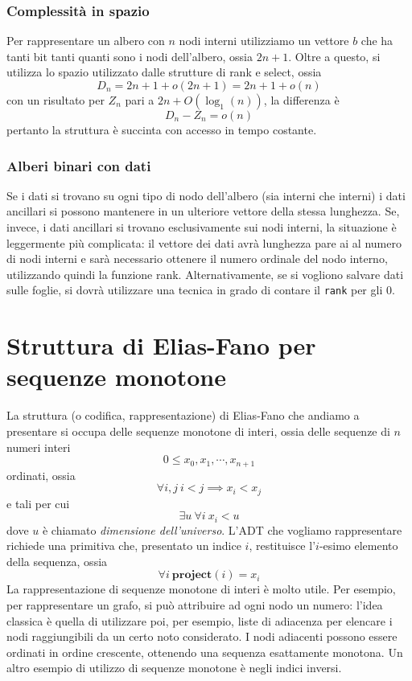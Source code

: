 \subsubsection{Complessità in spazio}
Per rappresentare un albero con $n$ nodi interni utilizziamo un vettore $b$ che ha tanti
bit tanti quanti sono i nodi dell'albero, ossia $2n +1$. Oltre a questo, si utilizza
lo spazio utilizzato dalle strutture di rank e select, ossia
$$
	D_n = 2n +1 + o(2n+1) = 2n + 1 + o(n)
$$
con un risultato per $Z_n$ pari a $2n + O(\log_1(n))$, la differenza è
$$
	D_n - Z_n = o(n)
$$
pertanto la struttura è succinta con accesso in tempo costante.

\subsubsection{Alberi binari con dati}
Se i dati si trovano su ogni tipo di nodo dell'albero (sia interni che interni) i dati
ancillari si possono mantenere in un ulteriore vettore della stessa lunghezza.
Se, invece, i dati ancillari si trovano esclusivamente sui nodi interni,
la situazione è leggermente più complicata: il vettore dei dati avrà
lunghezza pare ai al numero di nodi interni e sarà necessario ottenere il numero
ordinale del nodo interno, utilizzando quindi la funzione rank.
Alternativamente, se si vogliono salvare dati sulle foglie, si dovrà utilizzare
una tecnica in grado di contare il \texttt{rank} per gli $0$.

\section{Struttura di Elias-Fano per sequenze monotone}
La struttura (o codifica, rappresentazione) di Elias-Fano che andiamo
a presentare si occupa delle sequenze monotone di interi, ossia
delle sequenze di $n$ numeri interi
$$
	0 \leq x_0, x_1, \cdots, x_{n+1}
$$
ordinati, ossia
$$
	\forall i, j ~ i < j \implies x_i < x_j
$$
e tali per cui
$$
	\exists u ~ \forall i ~ x_i < u
$$
dove $u$ è chiamato \textit{dimensione dell'universo}.
L'ADT che vogliamo rappresentare richiede una primitiva
che, presentato un indice $i$, restituisce l'$i$-esimo elemento della sequenza,
ossia
$$
	\forall i ~ \mathbf{project}(i) = x_i
$$
La rappresentazione di sequenze monotone di interi è molto utile.
Per esempio, per rappresentare un grafo, si può attribuire ad ogni
nodo un numero: l'idea classica è quella di utilizzare poi, per esempio,
liste di adiacenza per elencare i nodi raggiungibili da un certo noto
considerato. I nodi adiacenti possono essere ordinati in ordine crescente,
ottenendo una sequenza esattamente monotona.
Un altro esempio di utilizzo di sequenze monotone è negli indici inversi.


